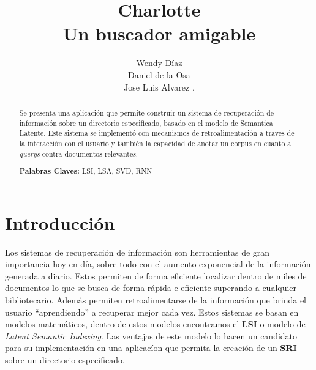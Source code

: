 \documentclass{llncs}
\newcommand{\mykeywords}[1]{\par\addvspace\baselineskip
\noindent \textbf{Palabras Claves:} \enspace\ignorespaces#1}
\begin{document}
\pagestyle{headings}  
\title{Charlotte \\ \small{Un buscador amigable}}
\author{
  Wendy Díaz   \\
  Daniel de la Osa   \\
  Jose Luis Alvarez  .
  }



\maketitle

\begin{abstract}
	Se presenta una aplicación que permite construir un sistema de recuperación de información sobre un directorio especificado, basado en el modelo de Semantica Latente. Este sistema se implementó con mecanismos de retroalimentación a traves de la interacción con el usuario y también la capacidad de anotar un corpus en cuanto a \emph{querys} contra documentos relevantes.
  \mykeywords{LSI, LSA, SVD, RNN}
\end{abstract}

\section{Introducción}

  Los sistemas de recuperación de información son herramientas de gran importancia hoy en día, sobre todo con el aumento exponencial de la información generada a diario. Estos permiten de forma eficiente localizar dentro de miles de documentos lo que se busca de forma rápida e eficiente superando a cualquier bibliotecario. Además permiten retroalimentarse de la información que brinda el usuario ``aprendiendo'' a recuperar mejor cada vez. Estos sistemas se basan en modelos matemáticos, dentro de estos modelos encontramos el \textbf{LSI} o modelo de \emph{ Latent Semantic Indexing}. Las ventajas de este modelo \cite{Daniel,Jose} lo hacen un candidato para su implementación en una aplicacíon que permita la creación de un \textbf{SRI} sobre un directorio especificado.
\end{document}
